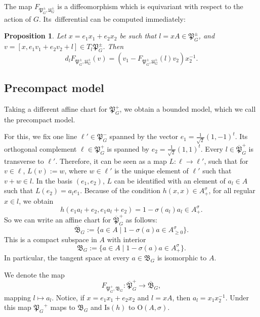\documentclass[oneside,11pt]{amsart}
\newtheorem{prop}[thm]{Proposition}
\theoremstyle{definition}
\theoremstyle{remark}
\numberwithin{thm}{section}
\numberwithin{equation}{section}
\begin{document}
The map $F_{\mathfrak{P}_G^\pm,\mathfrak{U}_G^\pm}$ is a diffeomorphism which is equivariant with respect to the action of $G$. Its~differential can be computed immediately:

\begin{prop}
    Let $x=e_1x_1+e_2x_2$ be such that $l=xA\in\mathfrak{P}_G^\pm$, and $v=[x,e_1v_1+e_2v_2+l]\in T_l\mathfrak{P}_G^\pm$. Then 
    $$d_{l}F_{\mathfrak{P}_G^\pm,\mathfrak{U}_G^\pm}(v)=(v_1-F_{\mathfrak{P}_G^\pm,\mathfrak{U}_G^\pm}(l) v_2)x_2^{-1}.$$
\end{prop} 

\subsection{Precompact model}\label{sec:precompact_O}
Taking a different affine chart for $\mathfrak{P}_G^+$, we obtain a bounded model, which we call the precompact model. 

For this, we fix one line $\ell'\in \mathfrak{P}_G^-$ spanned by the vector $e_1=\frac{1}{\sqrt{2}}(1,-1)^t$. Its orthogonal complement $\ell\in \mathfrak{P}_G^+$ is spanned by $e_2=\frac{1}{\sqrt{2}}(1,1)^t$. Every $l\in \overline{\mathfrak{P}}_G^+$ is transverse to $\ell'$. Therefore, it can be seen as a map $L\colon\ell\to\ell'$, such that for $v\in \ell$, $L(v):=w$, where $w\in\ell'$ is the unique element of $\ell'$ such that $v+w\in l$. In the basis $(e_1,e_2)$, $L$ can be identified with an element of $a_l\in A$ such that $L(e_2)=a_l e_1$. Because of the condition $ h(x,x)\in A^\sigma_+$, for all regular $x\in l$, we obtain \[ h(e_1a_l+e_2,e_1a_l+e_2)=1-\sigma(a_l)a_l\in A^\sigma_+.\] 
So we can write an affine chart for  $\overline{\mathfrak{P}}_G^+$ as follows:
$$\overline{\mathfrak{B}}_G:=\{a\in A\mid 1-\sigma(a)a\in A^\sigma_{\geq 0}\}.$$
This is a compact subspace in $A$ with interior 
$$\mathfrak{B}_G:=\{a\in A\mid 1-\sigma(a)a\in A^\sigma_+\}.$$ 
In particular, the tangent space at every $a\in \mathfrak{B}_G$ is isomorphic to $A$. 

We denote the map 
\begin{equation}\label{eq:ort_PB}
    F_{\mathfrak{P}_G^+,\mathfrak{B}_G}\colon\overline{\mathfrak{P}}_G^+\to\overline{\mathfrak{B}}_G,
\end{equation}
mapping $l\mapsto a_l$. Notice, if $x=e_1x_1+e_2x_2$ and $l=xA$, then $a_l=x_1x_2^{-1}$. Under this map ${\mathfrak{P}_G}^+$ maps to $\mathfrak{B}_G$ and $\mathrm{Is}( h)$ to $\mathrm O{(A,\sigma)}$.
\end{document}
